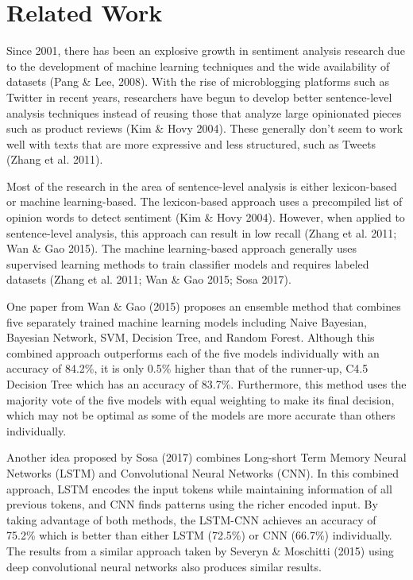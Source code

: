 \documentclass[letterpaper]{article} %
\begin{document}

\section{Related Work}

Since 2001, there has been an explosive growth in sentiment analysis research due to the development of machine learning techniques and the wide availability of datasets (Pang \& Lee, 2008). With the rise of microblogging platforms such as Twitter in recent years, researchers have begun to develop better sentence-level analysis techniques instead of reusing those that analyze large opinionated pieces such as product reviews (Kim \& Hovy 2004). These generally don't seem to work well with texts that are more expressive and less structured, such as Tweets (Zhang et al. 2011). 

Most of the research in the area of sentence-level analysis is either lexicon-based or machine learning-based. The lexicon-based approach uses a precompiled list of opinion words to detect sentiment (Kim \& Hovy 2004). However, when applied to sentence-level analysis, this approach can result in low recall (Zhang et al. 2011; Wan \& Gao 2015). The machine learning-based approach generally uses supervised learning methods to train classifier models and requires labeled datasets (Zhang et al. 2011; Wan \& Gao 2015; Sosa 2017).

One paper from Wan \& Gao (2015) proposes an ensemble method that combines five separately trained machine learning models including Naive Bayesian, Bayesian Network, SVM, Decision Tree, and Random Forest. Although this combined approach outperforms each of the five models individually with an accuracy of 84.2\%, it is only 0.5\% higher than that of the runner-up, C4.5 Decision Tree which has an accuracy of 83.7\%. Furthermore, this method uses the majority vote of the five models with equal weighting to make its final decision, which may not be optimal as some of the models are more accurate than others individually.

Another idea proposed by Sosa (2017) combines Long-short Term Memory Neural Networks (LSTM) and Convolutional Neural Networks (CNN). In this combined approach, LSTM encodes the input tokens while maintaining information of all previous tokens, and CNN finds patterns using the richer encoded input. By taking advantage of both methods, the LSTM-CNN achieves an accuracy of 75.2\% which is better than either LSTM (72.5\%) or CNN (66.7\%) individually. The results from a similar approach taken by Severyn \&  Moschitti  (2015) using deep convolutional neural networks also produces similar results.
\end{document}
